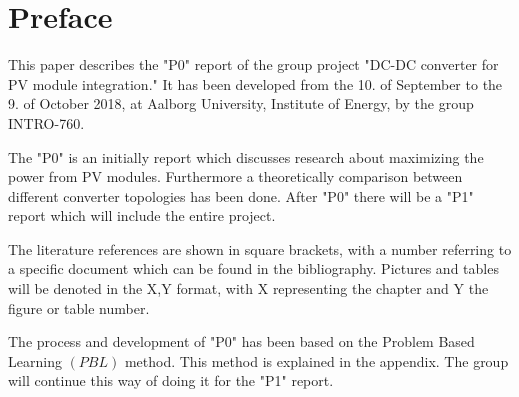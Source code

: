 \chapter*{Preface}

This paper describes the "P0" report of the group project "DC-DC converter for PV module integration." It has been developed from the 10. of September to the 9. of October 2018, at Aalborg University, Institute of Energy, by the group INTRO-760.

The "P0" is an initially report which discusses research about maximizing the power from PV modules.
Furthermore a theoretically comparison between different converter topologies has been done. After "P0" there will be a "P1" report which will include the entire project.

The literature references are shown in square brackets, with a number referring to a specific document which can be found in the bibliography. Pictures and tables will be denoted in the X,Y format, with X representing the chapter and Y the figure or table number. 

The process and development of "P0" has been based on the Problem Based Learning $(PBL)$ method. This method is explained in the appendix. The group will continue this way of doing it for the "P1" report.            